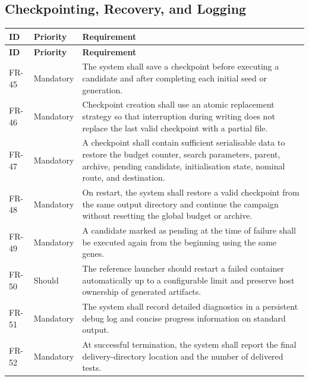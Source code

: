 \documentclass[11pt,a4paper]{report}
\begin{document}
\subsection{Checkpointing, Recovery, and Logging}
\begin{longtable}{L{1.7cm} L{2.1cm} L{10.8cm}}
\toprule
\textbf{ID} & \textbf{Priority} & \textbf{Requirement}\\
\midrule
\endfirsthead
\toprule
\textbf{ID} & \textbf{Priority} & \textbf{Requirement}\\
\midrule
\endhead
FR-45 & Mandatory & The system shall save a checkpoint before executing a candidate and after completing each initial seed or generation.\\
FR-46 & Mandatory & Checkpoint creation shall use an atomic replacement strategy so that interruption during writing does not replace the last valid checkpoint with a partial file.\\
FR-47 & Mandatory & A checkpoint shall contain sufficient serialisable data to restore the budget counter, search parameters, parent, archive, pending candidate, initialisation state, nominal route, and destination.\\
FR-48 & Mandatory & On restart, the system shall restore a valid checkpoint from the same output directory and continue the campaign without resetting the global budget or archive.\\
FR-49 & Mandatory & A candidate marked as pending at the time of failure shall be executed again from the beginning using the same genes.\\
FR-50 & Should & The reference launcher should restart a failed container automatically up to a configurable limit and preserve host ownership of generated artifacts.\\
FR-51 & Mandatory & The system shall record detailed diagnostics in a persistent debug log and concise progress information on standard output.\\
FR-52 & Mandatory & At successful termination, the system shall report the final delivery-directory location and the number of delivered tests.\\
\bottomrule
\end{longtable}
\end{document}
